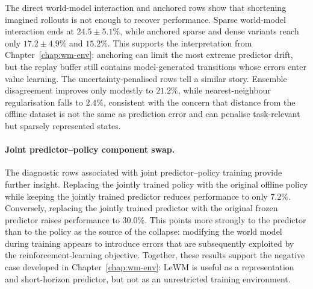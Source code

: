 The direct world-model interaction and anchored rows show that shortening
imagined rollouts is not enough to recover performance. Sparse
world-model interaction ends at $24.5 \pm 5.1\%$, while anchored sparse
and dense variants reach only $17.2 \pm 4.9\%$ and $15.2\%$. This
supports the interpretation from Chapter~\ref{chap:wm-env}: anchoring
can limit the most extreme predictor drift, but the replay buffer still
contains model-generated transitions whose errors enter value learning.
The uncertainty-penalised rows tell a similar story. Ensemble
disagreement improves only modestly to $21.2\%$, while nearest-neighbour
regularisation falls to $2.4\%$, consistent with the concern that
distance from the offline dataset is not the same as prediction error
and can penalise task-relevant but sparsely represented states.

\paragraph{Joint predictor--policy component swap.}
\label{sec:eval-joint}
The diagnostic rows associated with joint predictor--policy training
provide further insight. Replacing the jointly trained policy with the
original offline policy while keeping the jointly trained predictor
reduces performance to only $7.2\%$. Conversely, replacing the
jointly trained predictor with the original frozen predictor raises
performance to $30.0\%$. This points more strongly to the predictor
than to the policy as the source of the collapse: modifying the world
model during training appears to introduce errors that are subsequently
exploited by the reinforcement-learning objective. Together, these
results support the negative case developed in Chapter~\ref{chap:wm-env}:
LeWM is useful as a representation and short-horizon predictor, but not
as an unrestricted training environment.



